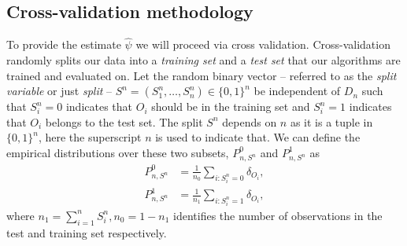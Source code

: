 \documentclass[11pt, a4paper]{article}
\theoremstyle{definition}
\theoremstyle{remark}
\newcommand{\la}{\psi}
\newcommand{\Sn}{S^n}
\begin{document}
\subsection{Cross-validation methodology}
To provide the estimate $ \hat{\la} $ we will proceed via cross validation. Cross-validation randomly splits our data into a \textit{training set} and a \textit{test set} that our algorithms are trained and evaluated on. Let the random binary vector -- referred to as the \textit{split variable} or just \textit{split} -- $ \Sn = (\Sn_1,\ldots,\Sn_n) \in \{0,1\}^{n} $ be independent of $ D_n $ such that $ \Sn_i = 0 $ indicates that $ O_i $ should be in the training set and $ \Sn_i = 1 $ indicates that $ O_i $ belongs to the test set. The split $ \Sn $ depends on $ n $ as it is a tuple in $ \{0,1\}^{n} $, here the superscript $ n $ is used to indicate that. We can define the empirical distributions over these two subsets, $ P_{n,\Sn}^0$ and $ P_{n,\Sn}^{1} $ as
\begin{align*}
    P_{n,\Sn}^{0} &= \frac{1}{n_0} \sum_{i: \Sn_i = 0} \delta_{O_i}, \\
    P_{n,\Sn}^{1} &= \frac{1}{n_1} \sum_{i: \Sn_i = 1} \delta_{O_i},
\end{align*}
where $ n_1 = \sum_{i = 1}^{n} \Sn_i, n_0 = 1-n_1$ identifies the number of observations in the test and training set respectively.
\end{document}
